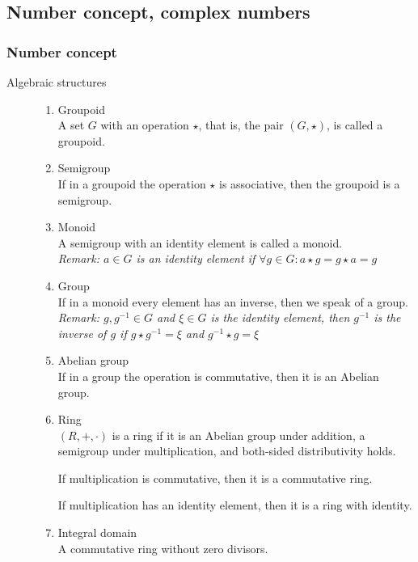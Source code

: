 \documentclass[margin=0px]{article}
\begin{document}
\subsection{Number concept, complex numbers}
\subsubsection{Number concept}
\begin{description}
    \item[Algebraic structures] \hfill
        \begin{enumerate}
            \item Groupoid \\
                  A set $G$ with an operation $\star$, that is, the pair $(G, \star)$, is called a groupoid.
            \item Semigroup\\
                  If in a groupoid the operation $\star$ is associative, then the groupoid is a semigroup.
            \item Monoid \\
                  A semigroup with an identity element is called a monoid.\\
                  \textit{Remark: $ a \in G$ is an identity element if $\forall g \in G : a \star g = g \star a = g$}
            \item Group \\
                  If in a monoid every element has an inverse, then we speak of a group. \\
                  \textit{Remark: $g,g^{-1} \in G$ and $\xi\in G$ is the identity element, then $g^{-1}$ is the inverse of $g$ if $g\star g^{-1} = \xi$ and $g^{-1} \star g = \xi$}
            \item Abelian group \\
                  If in a group the operation is commutative, then it is an Abelian group.
            \item Ring \\
                  $(R,+,\cdot )$ is a ring if it is an Abelian group under addition, a semigroup under multiplication, and both-sided distributivity holds.

                  If multiplication is commutative, then it is a commutative ring.

                  If multiplication has an identity element, then it is a ring with identity.
            \item Integral domain \\
                  A commutative ring without zero divisors.


\end{enumerate}
\end{description}
\end{document}
